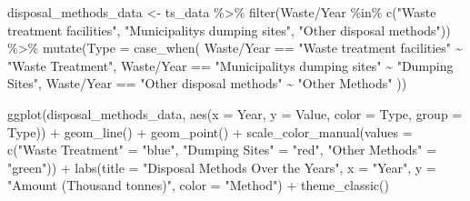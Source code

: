 \documentclass[
  11pt,
  a4paper,
  DIV=11,
  numbers=noendperiod]{scrartcl}
\newenvironment{Shaded}{\begin{snugshade}}{\end{snugshade}}
\newcommand{\AttributeTok}[1]{\textcolor[rgb]{0.40,0.45,0.13}{#1}}
\newcommand{\FunctionTok}[1]{\textcolor[rgb]{0.28,0.35,0.67}{#1}}
\newcommand{\NormalTok}[1]{\textcolor[rgb]{0.00,0.23,0.31}{#1}}
\newcommand{\OtherTok}[1]{\textcolor[rgb]{0.00,0.23,0.31}{#1}}
\newcommand{\SpecialCharTok}[1]{\textcolor[rgb]{0.37,0.37,0.37}{#1}}
\newcommand{\StringTok}[1]{\textcolor[rgb]{0.13,0.47,0.30}{#1}}
\begin{document}
\begin{Shaded}
\begin{Highlighting}[]
\NormalTok{disposal\_methods\_data }\OtherTok{\textless{}{-}}\NormalTok{ ts\_data }\SpecialCharTok{\%\textgreater{}\%}
  \FunctionTok{filter}\NormalTok{(}\StringTok{\textasciigrave{}}\AttributeTok{Waste/Year}\StringTok{\textasciigrave{}} \SpecialCharTok{\%in\%} \FunctionTok{c}\NormalTok{(}\StringTok{"Waste treatment facilities"}\NormalTok{, }
                             \StringTok{"Municipality\textquotesingle{}s dumping sites"}\NormalTok{, }
                             \StringTok{"Other disposal methods"}\NormalTok{)) }\SpecialCharTok{\%\textgreater{}\%}
  \FunctionTok{mutate}\NormalTok{(}\AttributeTok{Type =} \FunctionTok{case\_when}\NormalTok{(}
    \StringTok{\textasciigrave{}}\AttributeTok{Waste/Year}\StringTok{\textasciigrave{}} \SpecialCharTok{==} \StringTok{"Waste treatment facilities"} \SpecialCharTok{\textasciitilde{}} \StringTok{"Waste Treatment"}\NormalTok{,}
    \StringTok{\textasciigrave{}}\AttributeTok{Waste/Year}\StringTok{\textasciigrave{}} \SpecialCharTok{==} \StringTok{"Municipality\textquotesingle{}s dumping sites"} \SpecialCharTok{\textasciitilde{}} \StringTok{"Dumping Sites"}\NormalTok{,}
    \StringTok{\textasciigrave{}}\AttributeTok{Waste/Year}\StringTok{\textasciigrave{}} \SpecialCharTok{==} \StringTok{"Other disposal methods"} \SpecialCharTok{\textasciitilde{}} \StringTok{"Other Methods"}
\NormalTok{  ))}

\FunctionTok{ggplot}\NormalTok{(disposal\_methods\_data, }\FunctionTok{aes}\NormalTok{(}\AttributeTok{x =}\NormalTok{ Year, }\AttributeTok{y =}\NormalTok{ Value, }\AttributeTok{color =}\NormalTok{ Type, }\AttributeTok{group =}\NormalTok{ Type)) }\SpecialCharTok{+}
  \FunctionTok{geom\_line}\NormalTok{() }\SpecialCharTok{+}
  \FunctionTok{geom\_point}\NormalTok{() }\SpecialCharTok{+}
  \FunctionTok{scale\_color\_manual}\NormalTok{(}\AttributeTok{values =} \FunctionTok{c}\NormalTok{(}\StringTok{"Waste Treatment"} \OtherTok{=} \StringTok{"blue"}\NormalTok{, }\StringTok{"Dumping Sites"} \OtherTok{=} \StringTok{"red"}\NormalTok{, }\StringTok{"Other Methods"} \OtherTok{=} \StringTok{"green"}\NormalTok{)) }\SpecialCharTok{+}
  \FunctionTok{labs}\NormalTok{(}\AttributeTok{title =} \StringTok{"Disposal Methods Over the Years"}\NormalTok{,}
       \AttributeTok{x =} \StringTok{"Year"}\NormalTok{, }
       \AttributeTok{y =} \StringTok{"Amount (Thousand tonnes)"}\NormalTok{,}
       \AttributeTok{color =} \StringTok{"Method"}\NormalTok{) }\SpecialCharTok{+}
  \FunctionTok{theme\_classic}\NormalTok{()}
\end{Highlighting}
\end{Shaded}
\end{document}
